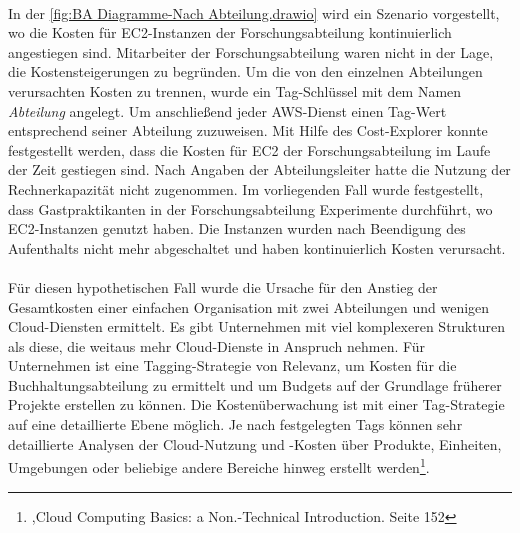 \\
In der \autoref{fig:BA Diagramme-Nach Abteilung.drawio} wird ein Szenario vorgestellt, wo die Kosten für EC2-Instanzen der Forschungsabteilung kontinuierlich angestiegen sind. Mitarbeiter der Forschungsabteilung waren nicht in der Lage, die Kostensteigerungen zu begründen. 
Um die von den einzelnen Abteilungen verursachten Kosten zu trennen, wurde ein Tag-Schlüssel mit dem Namen \textit{Abteilung} angelegt. Um anschließend jeder AWS-Dienst einen Tag-Wert entsprechend seiner Abteilung zuzuweisen. Mit Hilfe des Cost-Explorer konnte festgestellt werden, dass die Kosten für EC2 der Forschungsabteilung im Laufe der Zeit gestiegen sind. Nach Angaben der Abteilungsleiter hatte die Nutzung der Rechnerkapazität nicht zugenommen. Im vorliegenden Fall wurde festgestellt, dass Gastpraktikanten in der Forschungsabteilung Experimente durchführt, wo EC2-Instanzen genutzt haben. Die Instanzen wurden nach Beendigung des Aufenthalts nicht mehr abgeschaltet und haben kontinuierlich Kosten verursacht. 
\\\\
Für diesen hypothetischen Fall wurde die Ursache für den Anstieg der Gesamtkosten einer einfachen Organisation mit zwei Abteilungen und wenigen Cloud-Diensten ermittelt. Es gibt Unternehmen mit viel komplexeren Strukturen als diese, die weitaus mehr Cloud-Dienste in Anspruch nehmen. Für Unternehmen ist eine Tagging-Strategie von Relevanz, um Kosten für die Buchhaltungsabteilung zu ermittelt %
und um Budgets auf der Grundlage früherer Projekte erstellen zu können. Die Kostenüberwachung ist mit einer Tag-Strategie auf eine detaillierte Ebene möglich. Je nach festgelegten Tags können sehr detaillierte Analysen der Cloud-Nutzung und -Kosten über Produkte, Einheiten, Umgebungen oder beliebige andere Bereiche hinweg erstellt werden\footnote{\cite{CCB},Cloud Computing Basics: a Non.-Technical Introduction. Seite 152}.
